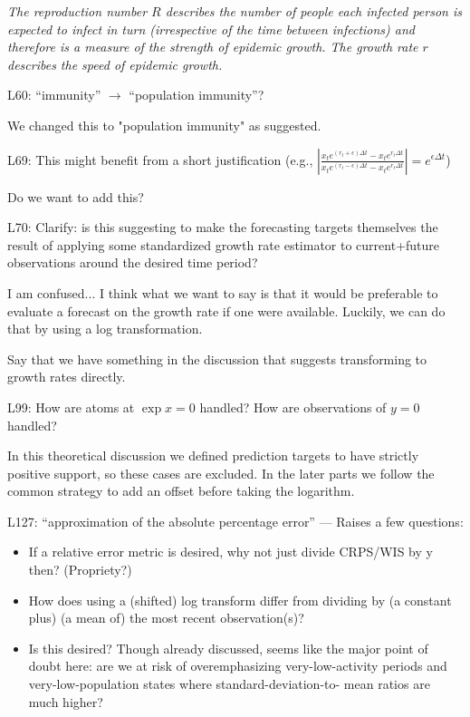 \documentclass{article}
\newcommand{\red}{\color{red}}
\newcommand{\black}{\color{black}}
\newcommand{\blue}{\color{blue}}
\begin{document}
\textit{The reproduction number $R$ describes the number of people each infected person is expected to infect in turn (irrespective of the time between infections) and therefore is a measure of the strength of epidemic growth. The growth rate $r$ describes the speed of epidemic growth.}

\blue
L60: “immunity” $\xrightarrow{}$ “population immunity”?

\black
We changed this to "population immunity" as suggested. 

\red
L69: This might benefit from a short justification (e.g.,
$\left| \frac{x_t e^{(r_t + \epsilon) \Delta t} - x_t e^{r_t \Delta t}}{x_t e^{(r_t - \epsilon) \Delta t} - x_t e^{r_t \Delta t}} \right| = e^{\epsilon\Delta t}$)

\black
Do we want to add this? 

\red
L70: Clarify: is this suggesting to make the forecasting targets themselves the result of applying some standardized growth rate estimator to current+future observations around the desired time period?

\black 
I am confused...
I think what we want to say is that it would be preferable to evaluate a forecast on the growth rate if one were available. Luckily, we can do that by using a log transformation. 

Say that we have something in the discussion that suggests transforming to growth rates directly. 


\red
L99: How are atoms at $\exp x = 0$ handled? How are observations of $y = 0$ handled?

\black
In this theoretical discussion we defined prediction targets to have strictly positive support, so these cases are excluded. In the later parts we follow the common strategy to add an offset before taking the logarithm. 

\red

L127: “approximation of the absolute percentage error” — Raises a few questions:
\begin{itemize}
    \item If a relative error metric is desired, why not just divide CRPS/WIS by y then? (Propriety?)
    \item How does using a (shifted) log transform differ from dividing by (a constant plus) (a mean of) the most recent observation(s)?
    \item Is this desired? Though already discussed, seems like the major point of doubt here: are we at risk of overemphasizing very-low-activity periods and very-low-population states where standard-deviation-to- mean ratios are much higher?
\end{itemize}
\end{document}
